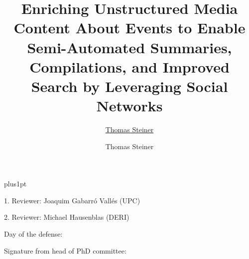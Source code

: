 \documentclass[twoside,11pt]{Latex/Classes/PhDthesisPSnPDF}
\title{Enriching Unstructured Media Content About Events to Enable Semi-Automated Summaries, Compilations, and Improved Search by Leveraging Social Networks}
\author{\href{mailto:tsteiner@lsi.upc.edu}{Thomas Steiner}}
\author{Thomas Steiner}
\begin{document}

\renewcommand\baselinestretch{1.2}
\baselineskip=18pt plus1pt



\maketitle  %



\newpage
\vspace{10mm}
1. Reviewer: Joaquim Gabarró Vallés (UPC)

\vspace{10mm}
2. Reviewer: Michael Hausenblas (DERI)

\vspace{20mm}
Day of the defense: 

\vspace{20mm}
\hspace{70mm}Signature from head of PhD committee:







%   



\frontmatter




\end{document}
